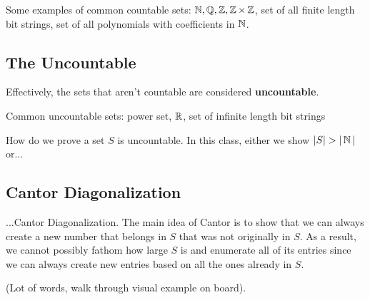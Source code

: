 Some examples of common countable sets: $\operatorname{\mathbb{N}}, \operatorname{\mathbb{Q}}, \operatorname{\mathbb{Z}}, \operatorname{\mathbb{Z}} \times \operatorname{\mathbb{Z}}$, set of all finite length bit strings, set of all polynomials with coefficients in $\operatorname{\mathbb{N}}$. 

\subsection{The Uncountable}
Effectively, the sets that aren't countable are considered \textbf{uncountable}. 

Common uncountable sets: power set, $\operatorname{\mathbb{R}}$, set of infinite length bit strings

How do we prove a set $S$ is uncountable. In this class, either we show $|S| > |\operatorname{\mathbb{N}}|$ or... 

\subsection{Cantor Diagonalization}
...Cantor Diagonalization. The main idea of Cantor is to show that we can always create a new number that belongs in $S$ that was not originally in $S$. As a result, we cannot possibly fathom how large $S$ is and enumerate all of its entries since we can always create new entries based on all the ones already in $S$. 

(Lot of words, walk through visual example on board). 